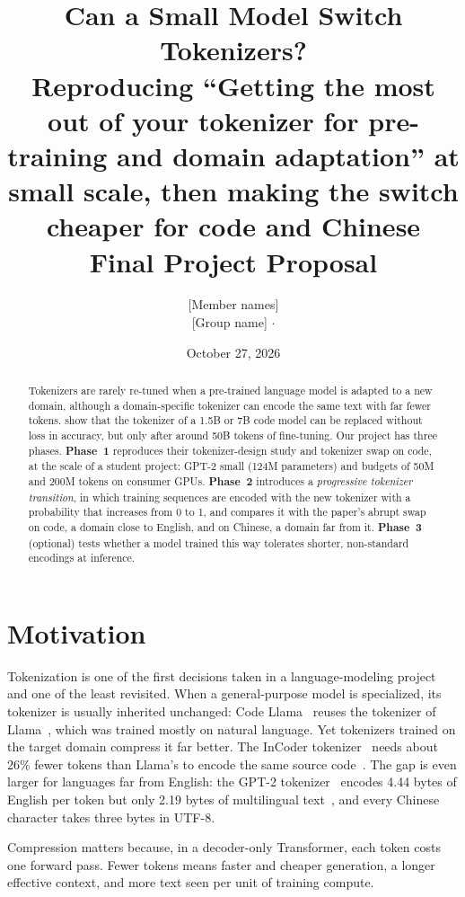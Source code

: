 \documentclass[11pt,a4paper]{article}
\title{Can a Small Model Switch Tokenizers?\\[4pt]
\large Reproducing ``Getting the most out of your tokenizer for pre-training and domain adaptation'' at small scale, then making the switch cheaper for code and Chinese\\[6pt]
\normalsize Final Project Proposal}
\author{[Member names] \\ {[Group name]} \quad $\cdot$ \quad [Course name]}
\date{October 27, 2026}
\begin{document}
\maketitle

\begin{abstract}
Tokenizers are rarely re-tuned when a pre-trained language model is adapted to a new domain, although a domain-specific tokenizer can encode the same text with far fewer tokens. \citet{dagan2024tokenizer} show that the tokenizer of a 1.5B or 7B code model can be replaced without loss in accuracy, but only after around 50B tokens of fine-tuning. Our project has three phases. \textbf{Phase~1} reproduces their tokenizer-design study and tokenizer swap on code, at the scale of a student project: GPT-2 small (124M parameters) and budgets of 50M and 200M tokens on consumer GPUs. \textbf{Phase~2} introduces a \emph{progressive tokenizer transition}, in which training sequences are encoded with the new tokenizer with a probability that increases from 0 to 1, and compares it with the paper's abrupt swap on code, a domain close to English, and on Chinese, a domain far from it. \textbf{Phase~3} (optional) tests whether a model trained this way tolerates shorter, non-standard encodings at inference.
\end{abstract}

\section{Motivation}
\label{sec:motivation}

Tokenization is one of the first decisions taken in a language-modeling project and one of the least revisited. When a general-purpose model is specialized, its tokenizer is usually inherited unchanged: Code Llama~\citep{roziere2023codellama} reuses the tokenizer of Llama~\citep{touvron2023llama}, which was trained mostly on natural language. Yet tokenizers trained on the target domain compress it far better. The InCoder tokenizer~\citep{fried2023incoder} needs about 26\% fewer tokens than Llama's to encode the same source code~\citep[Table~1]{dagan2024tokenizer}. The gap is even larger for languages far from English: the GPT-2 tokenizer~\citep{radford2019gpt2} encodes 4.44 bytes of English per token but only 2.19 bytes of multilingual text~\citep[Table~11]{dagan2024tokenizer}, and every Chinese character takes three bytes in UTF-8.

Compression matters because, in a decoder-only Transformer, each token costs one forward pass. Fewer tokens means faster and cheaper generation, a longer effective context, and more text seen per unit of training compute.
\end{document}
